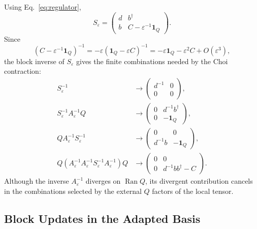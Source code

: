 \documentclass[aps,prb,onecolumn,nofootinbib,superscriptaddress]{revtex4-2}
\newcommand{\I}{\mathbf{1}}
\newcommand{\Ran}{\operatorname{Ran}}
\newcommand{\eps}{\varepsilon}
\theoremstyle{plain}
\theoremstyle{definition}
\begin{document}
Using Eq.~\eqref{eq:regulator},
\begin{equation}
  S_\eps
  =
  \begin{pmatrix}
    d & b^\dagger\\
    b & C-\eps^{-1}\I_Q
  \end{pmatrix}.
  \label{eq:S-adapted}
\end{equation}
Since
\begin{equation}
  (C-\eps^{-1}\I_Q)^{-1}
  =
  -\eps(\I_Q-\eps C)^{-1}
  =
  -\eps\I_Q-\eps^2C+O(\eps^3),
  \label{eq:Q-inverse-expansion}
\end{equation}
the block inverse of \(S_\eps\) gives the finite combinations needed by the
Choi contraction:
\begin{align}
  S_\eps^{-1}
  &\longrightarrow
  \begin{pmatrix}
    d^{-1}&0\\
    0&0
  \end{pmatrix},
  \label{eq:limit-one}
  \\
  S_\eps^{-1}A_\eps^{-1}Q
  &\longrightarrow
  \begin{pmatrix}
    0&d^{-1}b^\dagger\\
    0&-\I_Q
  \end{pmatrix},
  \label{eq:limit-two}
  \\
  QA_\eps^{-1}S_\eps^{-1}
  &\longrightarrow
  \begin{pmatrix}
    0&0\\
    d^{-1}b&-\I_Q
  \end{pmatrix},
  \label{eq:limit-three}
  \\
  Q\!\left(
    A_\eps^{-1}
    A_\eps^{-1}S_\eps^{-1}A_\eps^{-1}
  \right)Q
  &\longrightarrow
  \begin{pmatrix}
    0&0\\
    0&d^{-1}bb^\dagger-C
  \end{pmatrix}.
  \label{eq:limit-four}
\end{align}
Although the inverse \(A_\eps^{-1}\) diverges on \(\Ran Q\), its divergent
contribution cancels in the combinations selected by the external \(Q\)
factors of the local tensor.

\subsection{Block Updates in the Adapted Basis}
\end{document}
